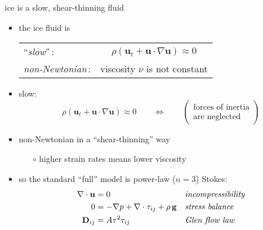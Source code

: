 \begin{frame}{ice is a slow, shear-thinning fluid}

\begin{itemize}
\item the ice fluid is

\smallskip
  \begin{tabular}{lc}
  ``\emph{slow}''\,: & $\rho \left(\mathbf{u}_t + \mathbf{u}\cdot\nabla \mathbf{u}\right) \approx 0$ \\
  \emph{non-Newtonian}\,: & viscosity $\nu$ is not constant
  \end{tabular}

\bigskip
\item slow:
  $$\rho \left(\mathbf{u}_t + \mathbf{u}\cdot\nabla \mathbf{u}\right) \approx 0 \qquad \iff \qquad \begin{pmatrix} \text{forces of inertia} \\ \text{are neglected} \end{pmatrix}$$

\medskip
\item non-Newtonian in a ``shear-thinning'' way
  \begin{itemize}
  \item[$\circ$] higher strain rates means lower viscosity
  \end{itemize}

\bigskip
\item so the standard ``full'' model is power-law ($n=3$) \alert{Stokes}:
\begin{align*}
\nabla \cdot \mathbf{u} &= 0 &&\text{\emph{incompressibility}} \\
0 &= - \nabla p + \nabla \cdot \tau_{ij} + \rho\, \mathbf{g} &&\text{\emph{stress balance}} \\
\mathbf{D}_{ij} &= A \tau^2 \tau_{ij} &&\text{\emph{Glen flow law}}
\end{align*}

\end{itemize}
\end{frame}


